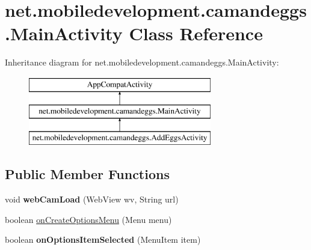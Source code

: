 \hypertarget{classnet_1_1mobiledevelopment_1_1camandeggs_1_1_main_activity}{}\section{net.\+mobiledevelopment.\+camandeggs.\+Main\+Activity Class Reference}
\label{classnet_1_1mobiledevelopment_1_1camandeggs_1_1_main_activity}
Inheritance diagram for net.\+mobiledevelopment.\+camandeggs.\+Main\+Activity\+:\begin{figure}[H]
\begin{center}
\leavevmode
\includegraphics[height=3.000000cm]{classnet_1_1mobiledevelopment_1_1camandeggs_1_1_main_activity}
\end{center}
\end{figure}
\subsection*{Public Member Functions}
\begin{DoxyCompactItemize}
\item 
\mbox{\label{classnet_1_1mobiledevelopment_1_1camandeggs_1_1_main_activity_ab3d2937015b4acf291bbc0c2703a6410}} 
void {\bfseries web\+Cam\+Load} (Web\+View wv, String url)
\item 
boolean \hyperlink{classnet_1_1mobiledevelopment_1_1camandeggs_1_1_main_activity_ab170f26993d4cca2a6932e5d7e780155}{on\+Create\+Options\+Menu} (Menu menu)
\item 
\mbox{\label{classnet_1_1mobiledevelopment_1_1camandeggs_1_1_main_activity_ac718827b27f95f142684757a8087f2de}} 
boolean {\bfseries on\+Options\+Item\+Selected} (Menu\+Item item)
\end{DoxyCompactItemize}
